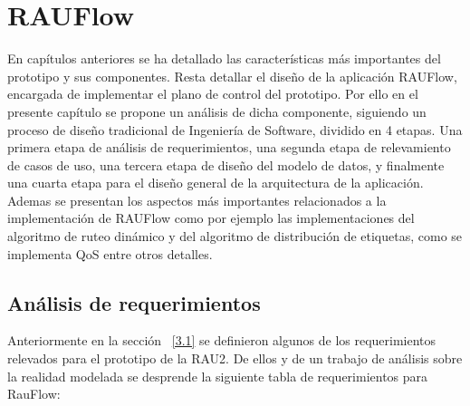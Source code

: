 \chapter{RAUFlow}
\label{Capítulo 5}

\ifpdf
    \graphicspath{{Chapter5/Figs/Raster/}{Chapter5/Figs/PDF/}{Chapter5/Figs/}}
\else
    \graphicspath{{Chapter5/Figs/Vector/}{Chapter5/Figs/}}
\fi

En cap\'itulos anteriores se ha detallado las caracter\'isticas m\'as importantes del prototipo y sus componentes. 
Resta detallar el dise\~no de la aplicaci\'on RAUFlow, encargada de implementar el plano de control del prototipo. Por ello en el presente cap\'itulo se propone un an\'alisis de dicha componente, siguiendo un proceso de dise\~no tradicional de Ingenier\'ia de Software, dividido en 4 etapas. Una primera etapa de an\'alisis de requerimientos, una segunda etapa de relevamiento de casos de uso, una tercera etapa de dise\~no del modelo de datos, y finalmente una cuarta etapa para el dise\~no general de la arquitectura de la aplicaci\'on. Ademas se presentan los aspectos m\'as importantes relacionados a la implementaci\'on de RAUFlow como por ejemplo las implementaciones del algoritmo de ruteo din\'amico y del algoritmo de distribución de etiquetas, como se implementa QoS entre otros detalles. 

\section[An\'alisi de requerimientos]{An\'alisis de requerimientos}

Anteriormente en la sección ~\ref{3.1} se definieron algunos de los requerimientos relevados para el prototipo de la RAU2. De ellos y de un trabajo de an\'alisis sobre la realidad modelada se desprende la siguiente tabla de requerimientos para RauFlow:


